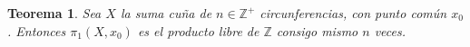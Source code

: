 \documentclass[letterpaper]{article} %
\date{}
\newtheorem{Tma}[equation]{Teorema}
\begin{document}
   
   \vspace{1cm}

   
   
   
   
   

   \begin{Tma}
      Sea $X$ la suma cuña de $n\in\mathbb{Z}^+$ circunferencias, con punto común $x_0$. Entonces $\pi_{1}(X,x_0)$ es el producto libre de $\mathbb{Z}$ consigo mismo $n$ veces. 
   \end{Tma}
\end{document}
